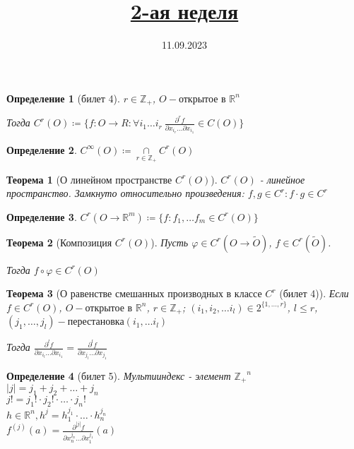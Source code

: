 \documentclass[11pt,a4paper,oneside]{scrartcl}
\title{\href{https://www.youtube.com/live/CfB6Jk_3U4o?si=kOlWnc-YSZmP9kN7}{2-ая неделя}}
\date{11.09.2023}
\newtheorem{definition}{Определение}
\newtheorem{theorem}{Теорема}
\begin{document}
\pagestyle{empty}

\maketitle

\begin{definition}[билет 4]
    $r \in \mathbb{Z_+}$, $O - \text{открытое в } \mathbb{R}^n$

    Тогда $C^r(O) \coloneqq \{ f \colon O \rightarrow R :
    \forall i_1 \dots i_r \ \frac{\partial^r f}{\partial x_{i_r} \dots \partial x_{i_1}} \in C(O) \}$
\end{definition}

\begin{definition}
    $C^{\infty} (O) \coloneqq \underset{r \in \mathbb{Z_+}}{\cap} C^r (O)$
\end{definition}

\begin{theorem}[О линейном пространстве $C^r (O)$]
    $C^r (O)$ - линейное пространство.
    Замкнуто относительно произведения: $f, g \in C^r : f \cdot g \in C^r$
\end{theorem}

\begin{definition}
    $C^r (O \rightarrow \mathbb{R}^m) \coloneqq \{f : f_1, \dots f_m \in C^r(O)\} $
\end{definition}

\begin{theorem}[Композиция $C^r (O)$]
    Пусть $\varphi \in C^r (O \rightarrow \tilde{O})$, $f \in C^r(\tilde{O})$.

    Тогда $f \circ \varphi \in C^r (O)$
\end{theorem}

\begin{theorem}[О равенстве смешанных производных в классе $C^r$ (билет 4)]
    Если $f \in C^r (O)$, $O - \text{открытое в } \mathbb{R}^n$, $r \in \mathbb{Z_+}$;
    $(i_1, i_2, \dots i_l) \in 2^{ \{1, \dots, r\} }$, $l \leq r$,
    $(j_1, \dots, j_l) - \text{перестановка} (i_1, \dots i_l)$

    Тогда $\frac{\partial^l f}{\partial x_{i_l} \dots \partial x_{i_1}}
        = \frac{\partial^l f}{\partial x_{j_l} \dots \partial x_{j_1}}$
\end{theorem}

\begin{definition}[билет 5]
    Мультииндекс - элемент $\mathbb{Z_+}^n$ \\
    $|j| = j_1 + j_2 + \dots + j_n$ \\
    $j! = j_1! \cdot j_2! \cdot \dots \cdot j_n!$ \\
    $h \in \mathbb{R}^n, h^j = h_1^{j_1} \cdot \dots \cdot h_n^{j_n}$ \\
    $f^(j) (a) = \frac{\partial^{|j|} f}{\partial x_n^{j_n} \dots \partial x_1^{j_1}} (a)$
\end{definition}
\end{document}
